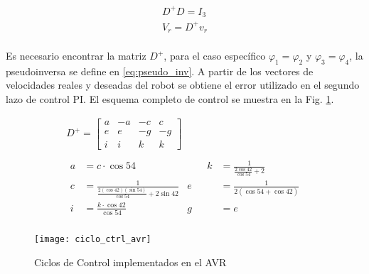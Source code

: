 \begin{gather}
	D^{+}D = I_3 \label{eq:DsToIdent} \\
	V_{r} = D^{+}v_r \label{eq:velsMotToVelsRob} \\
\end{gather}

Es necesario encontrar la matriz \( D^{+} \), para el caso específico \(  \varphi_1 = \varphi_2 \) y \(  \varphi_3 = \varphi_4 \), la pseudoinversa se define en \eqref{eq:pseudo_inv}. A partir  de los vectores de velocidades reales y deseadas del robot se obtiene el error utilizado en el segundo lazo de control PI. El esquema completo de control se muestra en la Fig. \ref{fig:ciclos_ctrl_avr}.

\begin{gather}
	D^{+} = \begin{bmatrix}a & -a &-c & c \\e & e & -g & -g \\ i & i & k & k \end{bmatrix} \\
	\label{eq:pseudo_inv} \\
	\begin{aligned}
	a & = c \cdot \cos 54  & \qquad k & = \frac{1}{\frac{2\cos 42}{\cos 54} + 2} \\
	c & = \frac{1}{\frac{2 (\cos 42)(\sin 54) }{\cos 54} + 2\sin 42} & e & = \frac{1}{2(\cos 54 + \cos 42)} \\ 
	i & = \frac{k \cdot \cos 42}{\cos 54} & g & = e \\
	\end{aligned}
\end{gather}

\begin{figure}
	\centering
		\texttt{[image: ciclo\_ctrl\_avr]}
	\caption{Ciclos de Control implementados en el AVR}
	\label{fig:ciclos_ctrl_avr}
\end{figure}


